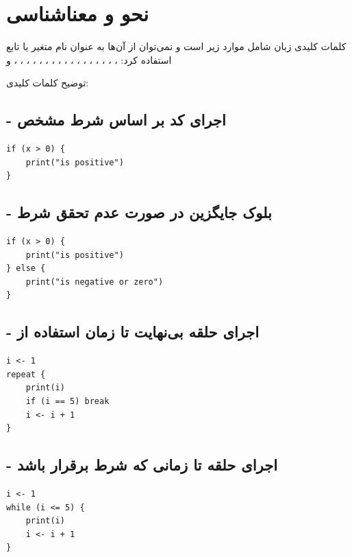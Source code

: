 \documentclass[11pt, a4paper, oneside]{book}
\begin{document}
		\section{نحو و معناشناسی}
		
			کلمات کلیدی زبان  شامل موارد زیر است و نمی‌توان از آن‌ها به عنوان نام متغیر یا تابع استفاده کرد:
			، ، ، ، ، ، ، ، ، ، ، ، ، ، ، ، ،  و 
			
			توضیح کلمات کلیدی:
			
			\subsection{ - اجرای کد بر اساس شرط مشخص}
				\begin{latin}
					\begin{lstlisting}[caption={\lr{if}}]
if (x > 0) {
	print("is positive")
}
					\end{lstlisting}
				\end{latin}
			
			\subsection{ - بلوک جایگزین در صورت عدم تحقق شرط}
				\begin{latin}
					\begin{lstlisting}[caption={\lr{else}}]
if (x > 0) {
	print("is positive")
} else {
	print("is negative or zero")
}
					\end{lstlisting}
				\end{latin}
				
			\subsection{ - اجرای حلقه بی‌نهایت تا زمان استفاده از }
				\begin{latin}
					\begin{lstlisting}[caption={\lr{repeat}}]
i <- 1
repeat {
	print(i)
	if (i == 5) break
	i <- i + 1
}
					\end{lstlisting}
				\end{latin}
				
				
			\subsection{ - اجرای حلقه تا زمانی که شرط برقرار باشد}
				\begin{latin}
					\begin{lstlisting}[caption={\lr{while}}]
i <- 1
while (i <= 5) {
	print(i)
	i <- i + 1
}
					\end{lstlisting}
				\end{latin}
				
\end{document}
